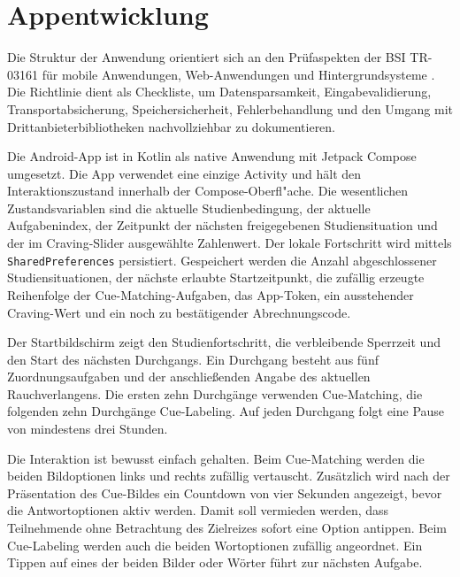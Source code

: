 

\chapter{Appentwicklung}

Die Struktur der Anwendung orientiert sich an den Prüfaspekten der BSI TR-03161 für mobile Anwendungen, Web-Anwendungen und Hintergrundsysteme \cite{bsi_tr03161_mobile_2024,bsi_tr03161_web_2024,bsi_tr03161_backend_2024}. Die Richtlinie dient als Checkliste, um Datensparsamkeit, Eingabevalidierung, Transportabsicherung, Speichersicherheit, Fehlerbehandlung und den Umgang mit Drittanbieterbibliotheken nachvollziehbar zu dokumentieren.

Die Android-App ist in Kotlin als native Anwendung mit Jetpack Compose umgesetzt. Die App verwendet eine einzige Activity und hält den Interaktionszustand innerhalb der Com\-pose-Ober\-fl"a\-che. Die wesentlichen Zustandsvariablen sind die aktuelle Studienbedingung, der aktuelle Aufgabenindex, der Zeitpunkt der nächsten freigegebenen Studiensituation und der im Craving-Slider ausgewählte Zahlenwert. Der lokale Fortschritt wird mittels \texttt{SharedPreferences} persistiert. Gespeichert werden die Anzahl abgeschlossener Studiensituationen, der nächste erlaubte Startzeitpunkt, die zufällig erzeugte Reihenfolge der Cue-Matching-Aufgaben, das App-Token, ein ausstehender Craving-Wert und ein noch zu bestätigender Abrechnungscode.

Der Startbildschirm zeigt den Studienfortschritt, die verbleibende Sperrzeit und den Start des nächsten Durchgangs. Ein Durchgang besteht aus fünf Zuordnungsaufgaben und der anschließenden Angabe des aktuellen Rauchverlangens. Die ersten zehn Durchgänge verwenden Cue-Matching, die folgenden zehn Durchgänge Cue-Labeling. Auf jeden Durchgang folgt eine Pause von mindestens drei Stunden.

Die Interaktion ist bewusst einfach gehalten. Beim Cue-Matching werden die beiden Bildoptionen links und rechts zufällig vertauscht. Zusätzlich wird nach der Präsentation des Cue-Bildes ein Countdown von vier Sekunden angezeigt, bevor die Antwortoptionen aktiv werden. Damit soll vermieden werden, dass Teilnehmende ohne Betrachtung des Zielreizes sofort eine Option antippen. Beim Cue-Labeling werden auch die beiden Wortoptionen zufällig angeordnet. Ein Tippen auf eines der beiden Bilder oder Wörter führt zur nächsten Aufgabe.


